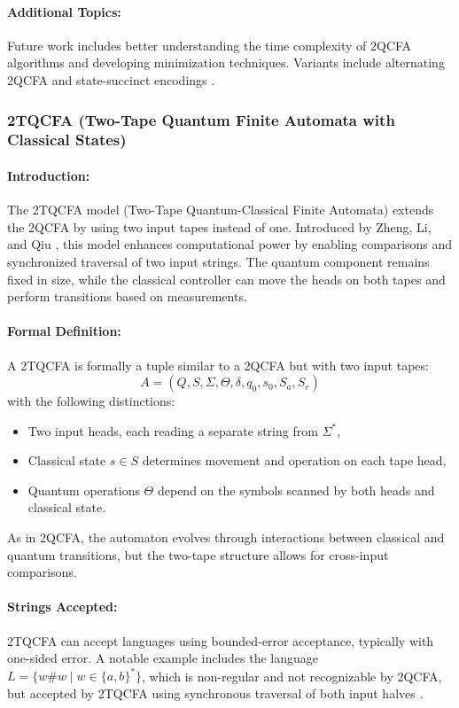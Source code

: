 \paragraph{Additional Topics:}  
Future work includes better understanding the time complexity of 2QCFA algorithms and developing minimization techniques. Variants include alternating 2QCFA and state-succinct encodings \cite{zheng2013state, remscrim2020lower}.

\subsubsection{2TQCFA (Two-Tape Quantum Finite Automata with Classical States)}

\paragraph{Introduction:}  
The 2TQCFA model (Two-Tape Quantum-Classical Finite Automata) extends the 2QCFA by using two input tapes instead of one. Introduced by Zheng, Li, and Qiu \cite{zheng2011two}, this model enhances computational power by enabling comparisons and synchronized traversal of two input strings. The quantum component remains fixed in size, while the classical controller can move the heads on both tapes and perform transitions based on measurements.

\paragraph{Formal Definition:}  
A 2TQCFA is formally a tuple similar to a 2QCFA but with two input tapes:
\[
A = (Q, S, \Sigma, \Theta, \delta, q_0, s_0, S_a, S_r)
\]
with the following distinctions:
\begin{itemize}
    \item Two input heads, each reading a separate string from $\Sigma^*$,
    \item Classical state $s \in S$ determines movement and operation on each tape head,
    \item Quantum operations $\Theta$ depend on the symbols scanned by both heads and classical state.
\end{itemize}
As in 2QCFA, the automaton evolves through interactions between classical and quantum transitions, but the two-tape structure allows for cross-input comparisons.

\paragraph{Strings Accepted:}  
2TQCFA can accept languages using bounded-error acceptance, typically with one-sided error. A notable example includes the language $L = \{ w \# w \mid w \in \{a, b\}^* \}$, which is non-regular and not recognizable by 2QCFA, but accepted by 2TQCFA using synchronous traversal of both input halves \cite{zheng2011two}.

